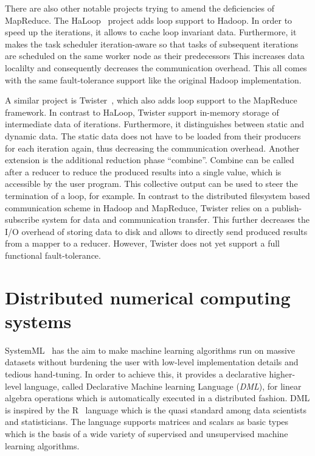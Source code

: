 There are also other notable projects trying to amend the deficiencies of MapReduce.
The HaLoop~\cite{bu:pve2010a} project adds loop support to Hadoop.
In order to speed up the iterations, it allows to cache loop invariant data.
Furthermore, it makes the task scheduler iteration-aware so that tasks of subsequent iterations are scheduled on the same worker node as their predecessors
This increases data localilty and consequently decreases the communication overhead.
This all comes with the same fault-tolerance support like the original Hadoop implementation.

A similar project is Twister~\cite{ekanayake:2010a}, which also adds loop support to the MapReduce framework.
In contrast to HaLoop, Twister support in-memory storage of intermediate data of iterations.
Furthermore, it distinguishes between static and dynamic data.
The static data does not have to be loaded from their producers for each iteration again, thus decreasing the communication overhead.
Another extension is the additional reduction phase ``combine''.
Combine can be called after a reducer to reduce the produced results into a single value, which is accessible by the user program.
This collective output can be used to steer the termination of a loop, for example.
In contrast to the distributed filesystem based communication scheme in Hadoop and MapReduce, Twister relies on a publish-subscribe system for data and communication transfer.
This further decreases the I/O overhead of storing data to disk and allows to directly send produced results from a mapper to a reducer.
However, Twister does not yet support a full functional fault-tolerance.

\section{Distributed numerical computing systems}

SystemML~\cite{ghoting:2011a} has the aim to make machine learning algorithms run on massive datasets without burdening the user with low-level implementation details and tedious hand-tuning.
In order to achieve this, it provides a declarative higher-level language, called Declarative Machine learning Language (\emph{DML}), for linear algebra operations which is automatically executed in a distributed fashion.
DML is inspired by the R~\cite{r:1993a} language which is the quasi standard among data scientists and statisticians.
The language supports matrices and scalars as basic types which is the basis of a wide variety of supervised and unsupervised machine learning algorithms.

